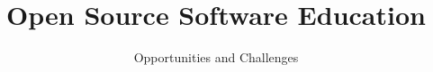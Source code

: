 \documentclass{sig-alternate}
\begin{document}
%

\title{Open Source Software Education}
\subtitle{Opportunities and Challenges}
%
%
%
%
%
\end{document}
